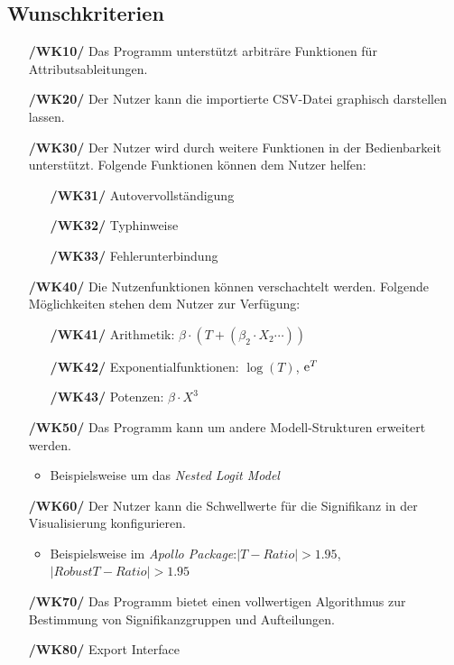 \documentclass{article}
\begin{document}
\subsection{Wunschkriterien}
\begin{itemize}
    \item[\textbf{/WK10/}] Das Programm unterstützt arbiträre Funktionen für Attributsableitungen.
    \item[\textbf{/WK20/}] Der Nutzer kann die importierte CSV-Datei graphisch darstellen lassen.
    \item[\textbf{/WK30/}] Der Nutzer wird durch weitere Funktionen in der Bedienbarkeit unterstützt. \newline Folgende Funktionen können dem Nutzer helfen:
    \begin{itemize}[leftmargin=.7in]
        \item[\textbf{/WK31/}] Autovervollständigung
        \item[\textbf{/WK32/}] Typhinweise
        \item[\textbf{/WK33/}] Fehlerunterbindung
    \end{itemize}
    \item[\textbf{/WK40/}] Die Nutzenfunktionen können verschachtelt werden.
    \newline Folgende Möglichkeiten stehen dem Nutzer zur Verfügung:
    \begin{itemize}[leftmargin=.7in]
        \item[\textbf{/WK41/}] Arithmetik: $\beta \cdot (T + (\beta_2 \cdot X_2 \cdots))$
        \item[\textbf{/WK42/}] Exponentialfunktionen: $\log(T)$, ${\rm e}^T$
        \item[\textbf{/WK43/}] Potenzen: $\beta \cdot X^3$
    \end{itemize}
    \item[\textbf{/WK50/}] Das Programm kann um andere Modell-Strukturen erweitert werden.
    \begin{itemize}
        \item Beispielsweise um das \textit{Nested Logit Model}
    \end{itemize}
    \item[\textbf{/WK60/}] Der Nutzer kann die Schwellwerte für die Signifikanz in der Visualisierung konfigurieren.
    \begin{itemize}
        \item Beispielsweise im \textit{Apollo Package}:\newline $|T-Ratio | > 1.95$, $|Robust T-Ratio | > 1.95$
    \end{itemize}    
    \item[\textbf{/WK70/}] Das Programm bietet einen vollwertigen Algorithmus zur Bestimmung von Signifikanzgruppen und Aufteilungen.
    \item[\textbf{/WK80/}] Export Interface 
\end{itemize}
\end{document}

